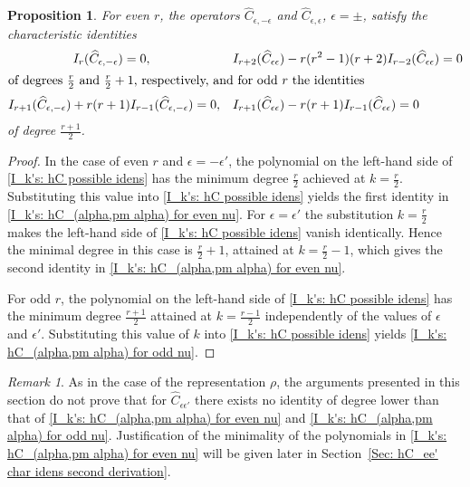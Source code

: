 \documentclass[a4paper]{article}
\newcommand{\hC}{\widehat{C}}
\renewcommand{\=}{\ =\ }
\numberwithin{equation}{section}
\newtheorem{proposition}{Proposition}
\theoremstyle{remark}
\newtheorem{remark}{Remark}
\begin{document}
\begin{proposition}\label{I_k hC_epsilon,epsilon' char idens}
For even $r$, the operators $\hC_{\epsilon,-\epsilon}$ and
$\hC_{\epsilon,\epsilon}$, $\epsilon=\pm$, satisfy the characteristic
identities
\begin{align}
&\hspace{1.8cm}
I_r(\hC_{\epsilon,-\epsilon})=0, & & I_{r+2}(\hC_{\epsilon\epsilon}) - r(r^2-1)(r+2) I_{r-2}(\hC_{\epsilon\epsilon}) =0 \label{I_k's: hC_(alpha,pm alpha) for even nu} \\
\intertext{of degrees $\frac{r}{2}$ and $\frac{r}{2}+1$, respectively,
and for odd $r$ the identities}
& I_{r+1}(\hC_{\epsilon,-\epsilon}) + r(r+1)I_{r-1}(\hC_{\epsilon,-\epsilon}) =0, & & I_{r+1}(\hC_{\epsilon\epsilon}) - r(r+1)I_{r-1}(\hC_{\epsilon\epsilon}) =0 \label{I_k's: hC_(alpha,pm alpha) for odd nu}
\end{align}
of degree $\frac{r+1}{2}$.
\end{proposition}

\begin{proof}
In the case of even $r$ and $\epsilon=-\epsilon'$, the polynomial on
the left-hand side of \eqref{I_k's: hC possible idens} has the minimum degree
$\tfrac{r}{2}$ achieved at $k=\tfrac{r}{2}$. Substituting this value
into \eqref{I_k's: hC possible idens} yields the first identity in
\eqref{I_k's: hC_(alpha,pm alpha) for even nu}. For $\epsilon=\epsilon'$
the substitution $k=\tfrac{r}{2}$ makes the left-hand side of
\eqref{I_k's: hC possible idens} vanish identically. Hence the minimal
degree in this case is $\tfrac{r}{2}+1$, attained at
$k=\tfrac{r}{2}-1$, which gives the second identity in
\eqref{I_k's: hC_(alpha,pm alpha) for even nu}.

For odd $r$, the polynomial on the left-hand side of
\eqref{I_k's: hC possible idens} has the minimum degree
$\tfrac{r+1}{2}$ attained at $k=\tfrac{r-1}{2}$ independently of the
values of $\epsilon$ and $\epsilon'$. Substituting this value of $k$
into \eqref{I_k's: hC possible idens} yields
\eqref{I_k's: hC_(alpha,pm alpha) for odd nu}.
\end{proof}


\begin{remark}
As in the case of the representation $\rho$, the arguments presented in this section do not prove that for $\hC_{\epsilon\epsilon'}$ there exists no identity of degree lower than that of
\eqref{I_k's: hC_(alpha,pm alpha) for even nu} and
\eqref{I_k's: hC_(alpha,pm alpha) for odd nu}.
Justification of the minimality of the polynomials in
\eqref{I_k's: hC_(alpha,pm alpha) for even nu}
will be given later in Section~\ref{Sec: hC_ee' char idens second derivation}.
\end{remark}
\end{document}
